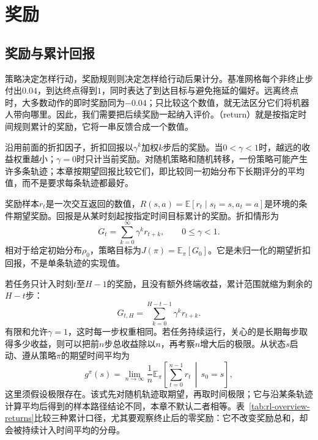 \section{奖励}
\label{sec:rl-overview-rewards}

\subsection{奖励与累计回报}
\label{sec:rl-overview-return}

策略决定怎样行动，奖励规则则决定怎样给行动后果计分。基准网格每个非终止步付出$0.04$，到达终点得到$1$，同时表达了到达目标与避免拖延的偏好。远离终点时，大多数动作的即时奖励同为$-0.04$；只比较这个数值，就无法区分它们将机器人带向哪里。因此，我们需要把后续奖励一起纳入评价。（return）就是按指定时间规则累计的奖励，它将一串反馈合成一个数值。

沿用前面的折扣因子，折扣回报以$\gamma^k$加权$k$步后的奖励。当$0<\gamma<1$时，越远的收益权重越小；$\gamma=0$时只计当前奖励。对随机策略和随机转移，一份策略可能产生许多条轨迹；本章按期望回报比较它们，即比较同一初始分布下长期评分的平均值，而不是要求每条轨迹都最好。

\begin{definition}[回报与策略目标]
  \label{def:rl-overview-return}
  奖励样本$r_t$是一次交互返回的数值，$R(s,a)=\mathbb E[r_t\mid s_t=s,a_t=a]$是环境的条件期望奖励。回报是从某时刻起按指定时间目标累计的奖励。折扣情形为
  \begin{equation}
    G_t=\sum_{k=0}^{\infty}\gamma^k r_{t+k},
    \qquad 0\leq\gamma<1.
    \label{eq:rl-overview-return}
  \end{equation}
  相对于给定初始分布$\rho_0$，策略目标为$J(\pi)=\mathbb E_\pi[G_0]$。它是未归一化的期望折扣回报，不是单条轨迹的实现值。
\end{definition}

若任务只计入时刻$t$至$H-1$的奖励，且没有额外终端收益，累计范围就缩为剩余的$H-t$步：
\[
  G_{t,H}=\sum_{k=0}^{H-t-1}\gamma^k r_{t+k}.
\]
有限和允许$\gamma=1$，这时每一步权重相同。若任务持续运行，关心的是长期每步取得多少收益，则可以把前$n$步总收益除以$n$，再考察$n$增大后的极限。从状态$s$启动、遵从策略$\pi$的期望时间平均为
\[
  g^\pi(s)=\lim_{n\to\infty}\frac{1}{n}
    \mathbb E_\pi\left[\sum_{t=0}^{n-1}r_t\,\middle|\,s_0=s\right],
\]
这里须假设极限存在。该式先对随机轨迹取期望，再取时间极限；它与沿某条轨迹计算平均后得到的样本路径结论不同，本章不默认二者相等。表~\ref{tab:rl-overview-returns}比较三种累计口径，尤其要观察终止后的零奖励：它不改变奖励总和，却会被持续计入时间平均的分母。

